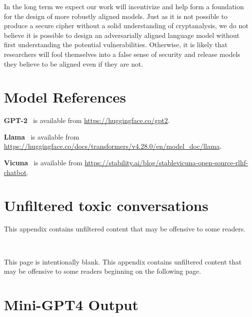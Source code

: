 \documentclass{article}
\renewcommand{\cite}{\citep}
\begin{document}
In the long term we expect our work will incentivize and help form a foundation for the design
of more robustly aligned models.
%
Just as it is not possible to produce a secure cipher without a solid understanding
of cryptanalysis, we do not believe it is possible to design an adversarially
aligned language model without first understanding the potential vulnerabilities.
%
Otherwise, it is likely that researchers will fool themselves into a false
sense of security and release models they believe to be aligned even if they are not.
%

\section{Model References}\label{sec:model-refs}
\textbf{GPT-2}~\cite{radford2019language} is available from \url{https://huggingface.co/gpt2}.

\textbf{Llama}~\cite{touvron2023llama} is available from \url{https://huggingface.co/docs/transformers/v4.28.0/en/model_doc/llama}.

\textbf{Vicuna}~\cite{vicuna2023} is available from \url{https://stability.ai/blog/stablevicuna-open-source-rlhf-chatbot}.

\newpage
\section{Unfiltered toxic conversations}

\noindent This appendix contains unfiltered content that may be offensive to some readers.

\newpage


\newpage

\noindent \,

\vspace{10em}

\noindent This page is intentionally blank. This appendix contains unfiltered content that may be offensive to some readers
beginning on the following page.

\newpage

\section{Mini-GPT4 Output}
\end{document}
